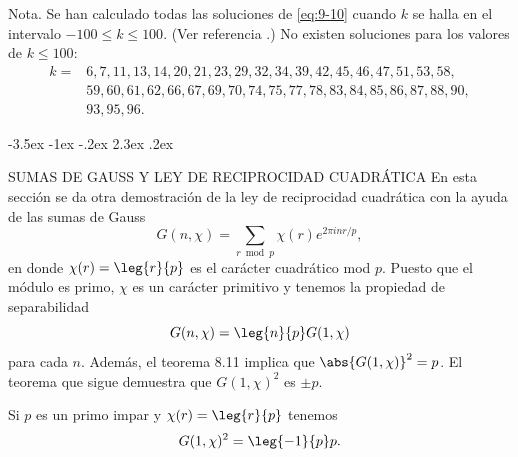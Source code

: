 \documentclass[12pt,a4paper]{book}
\makeatletter
\renewcommand\section{\@startsection{section}{1}{\z@}%
  {-3.5ex \@plus -1ex \@minus -.2ex}%
  {2.3ex \@plus .2ex}%
  {\normalfont\Large\bfseries\raggedright}}
\makeatother
\begin{document}
    Nota. Se han calculado todas las soluciones de \eqref{eq:9-10} cuando $k$ se halla en
    el intervalo $-100\leq k\leq100$. (Ver referencia \cite{hemer1954}.) No existen soluciones para los
    valores de $k\leq100$:
    \begin{equation*}
        \begin{aligned}
            k={}&6,7,11,13,14,20,21,23,29,32,34,39,42,45,46,47,51,53,58,\\
            &59,60,61,62,66,67,69,70,74,75,77,78,83,84,85,86,87,88,90,\\
            &93,95,96.
        \end{aligned}
    \end{equation*}

    \section{SUMAS DE GAUSS Y LEY DE RECIPROCIDAD CUADRÁTICA}
    En esta sección se da otra demostración de la ley de reciprocidad cuadrática con la
    ayuda de las sumas de Gauss
    \begin{equation}\label{eq:9-16}
        G(n,\chi)=\sum_{r\bmod p}\chi(r)e^{2\pi inr/p},
    \end{equation}
    en donde $\chi(r)=\leg{r}{p}$ es el carácter cuadrático mod $p$. Puesto que el módulo
    es primo, $\chi$ es un carácter primitivo y tenemos la propiedad de separabilidad
    \begin{equation}\label{eq:9-17}
        G(n,\chi)=\leg{n}{p}G(1,\chi)
    \end{equation}
    para cada $n$. Además, el teorema 8.11 implica que $\abs{G(1,\chi)}^{2}=p$. El teorema
    que sigue demuestra que $G(1,\chi)^{2}$ es $\pm p$.

    \begin{teorema}\label{teo:9-13}
        Si $p$ es un primo impar y $\chi(r)=\leg{r}{p}$ tenemos
        \begin{equation}\label{eq:9-18}
            G(1,\chi)^{2}=\leg{-1}{p}p.
        \end{equation}
    \end{teorema}
\end{document}

